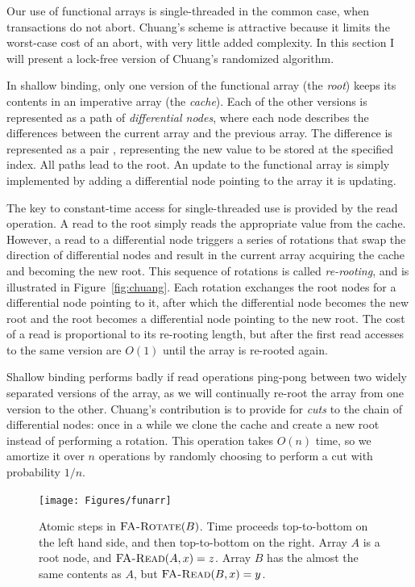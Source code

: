 Our use of functional arrays is single-threaded in the common case,
when transactions do not abort.  Chuang's scheme is attractive because
it limits the worst-case cost of an abort, with very little added
complexity.   In this section I will present a lock-free version of
Chuang's randomized algorithm.

In shallow binding, only one version of the functional array (the
\emph{root}) keeps its contents in an imperative array (the
\emph{cache}).   Each of the other versions is represented as a path
of \emph{differential nodes}, where each node describes the
differences between the current array and the previous array.  The
difference is represented as a pair ,
representing the new value to be stored at the specified index.
All paths lead to the root.  An update to the functional array is
simply implemented by adding a differential node pointing to the array it is
updating.

The key to constant-time access for single-threaded use is provided by the read
operation.  A read to the root simply reads the appropriate value from
the cache.  However, a read to a differential node triggers a series
of rotations that swap the direction of differential nodes and result
in the current array acquiring the cache and becoming the new root.
This sequence of rotations is called \emph{re-rooting}, and is
illustrated in Figure~\ref{fig:chuang}.  Each rotation
exchanges the root nodes for a differential node pointing to it, after
which the differential node becomes the new root and the root becomes
a differential node pointing to the new root. The cost of a read is
proportional to its re-rooting length, but after the first read
accesses to the same version are $O(1)$ until the array is re-rooted again.

Shallow binding performs badly if read operations ping-pong between two
widely separated versions of the array, as we will continually
re-root the array from one version to the other.
Chuang's contribution is to provide for \emph{cuts} to the chain of
differential nodes: once in a while we clone the cache and create a
new root instead of performing a rotation.  This operation takes
$O(n)$ time, so we amortize it over $n$ operations by randomly
choosing to perform a cut with probability $1/n$.

\begin{figure}\centering%
\texttt{[image: Figures/funarr]}
\caption[Atomic steps in $\funcname{FA-Rotate}(B)$.]%
 {Atomic steps in $\funcname{FA-Rotate}(B)$.  Time proceeds top-to-bottom
  on the left hand side, and then top-to-bottom on the right.
  Array $A$ is a root node, and $\text{\sc FA-Read}(A, x)=z$.
  Array $B$ has the almost the same contents as $A$, but
  $\text{\sc FA-Read}(B, x)=y$.}
\label{fig:funarr}
\end{figure}

